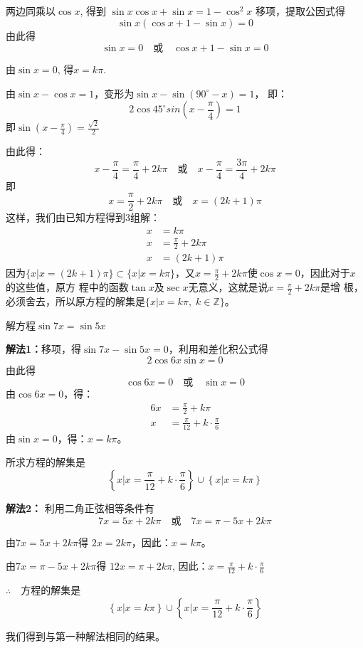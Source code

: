 \begin{solution}
两边同乘以$\cos x$, 得到
$\sin x\cos x+\sin x=1-\cos^2x$
移项，提取公因式得
\[\sin x(\cos x +1-\sin x)=0\]
由此得
\[\sin x=0\quad  \text{或}\quad \cos x+1-\sin x=0\]

由$\sin x=0$, 得$x=k\pi$. 

由$\sin x-\cos x=1$，变形为$\sin x-\sin(90^{\circ}-x)=1$，
即：
\[2\cos45^{\circ} sin\left(x-\frac{\pi}{4}\right)=1\]
即$\sin\left(x-\frac{\pi}{4}\right)=\frac{\sqrt{2}}{2}$

由此得：
\[x-\frac{\pi}{4}=\frac{\pi}{4}+2k\pi\quad  \text{或}\quad x-\frac{\pi}{4}=\frac{3\pi}{4}+2k\pi\]
即
\[x=\frac{\pi}{2}+2k\pi\quad  \text{或}\quad x=(2k+1)\pi\]
这样，我们由已知方程得到3组解：
\begin{align}
    x&=k\pi\\
    x&=\frac{\pi}{2}+2k\pi\\
    x&=(2k+1)\pi
\end{align}
因为$\{x|x=(2k+1)\pi\}\subset \{x|x=k\pi\}$，又$x=\frac{\pi}{2}+2k\pi$使$\cos x=0$，因此对于$x$的这些值，原方
程中的函数$\tan x$及$\sec x$无意义，这就是说$x=\frac{\pi}{2}+2k\pi$是增
根，必须舍去，所以原方程的解集是$\{x|x=k\pi,\; k\in\mathbb{Z}\}$。
\end{solution}

\begin{example}
    解方程$\sin7x=\sin5x$
\end{example}

\begin{solution}    
\textbf{解法1：}移项，得$\sin7x-\sin5x=0$，利用和差化积公式得
\[2\cos6x\sin x=0\]
由此得
\[\cos6x=0\quad  \text{或}\quad \sin x=0\]
由$\cos6x=0$，得：
\[\begin{split}
    6x&=\frac{\pi}{2}+k\pi\\
    x&=\frac{\pi}{12}+k\cdot \frac{\pi}{6}
\end{split} \]
由$\sin x=0$，得：$x=k\pi$。
    
所求方程的解集是
\[\left\{x\big|x=\frac{\pi}{12}+k\cdot \frac{\pi}{6}\right\}\cup\left\{x\big|x=k\pi\right\} \]
    
\textbf{解法2：} 利用二角正弦相等条件有
\[7x=5x+2k\pi \quad \text{或}\quad 7x=\pi -5x+2k\pi \]

由$7x=5x+2k\pi$得 $2x=2k\pi$，因此：$x=k\pi$。

由$7x=\pi -5x+2k\pi$得
$12x=\pi +2k\pi$, 因此：$x=\frac{\pi}{12}+k\cdot \frac{\pi}{6}$

$\therefore\quad $方程的解集是
\[\left\{x\big|x=k\pi\right\}\cup\left\{x\big|x=\frac{\pi}{12}+k\cdot \frac{\pi}{6}\right\} \]

我们得到与第一种解法相同的结果。
\end{solution}

